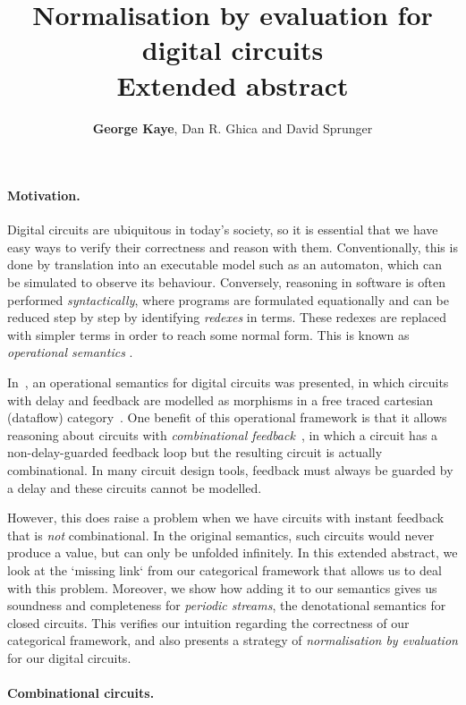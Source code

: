 \documentclass[11pt,numbib]{article}
\title{\vspace{-2em}\huge Normalisation by evaluation for digital circuits\\\Large\textbf{Extended abstract}}
\author{\textbf{George Kaye}, Dan R. Ghica and David Sprunger}
\begin{document}
    
\maketitle

\paragraph*{Motivation.}

Digital circuits are ubiquitous in today's society, so it is essential that we have easy ways to  verify their correctness and reason with them.
Conventionally, this is done by translation into an executable model such as an automaton, which can be simulated to observe its behaviour.
Conversely, reasoning in software is often performed \textit{syntactically}, where programs are formulated equationally and can be reduced step by step by identifying \textit{redexes} in terms. 
These redexes are replaced with simpler terms in order to reach some normal form.
This is known as \textit{operational semantics} \cite{plotkin2004semantics}.

In~\cite{ghica2016categorical}, an operational semantics for digital circuits was presented, in which circuits with delay and feedback are modelled as morphisms in a free traced cartesian (dataflow) category~\parencite{cazanescu1990algebraic,cazanescu1994feedback}.
One benefit of this operational framework is that it allows reasoning about circuits with \emph{combinational feedback}~\parencite[Example 1]{ghica2016categorical}, in which a circuit has a non-delay-guarded feedback loop but the resulting circuit is actually combinational.
In many circuit design tools, feedback must always be guarded by a delay and these circuits cannot be modelled.

However, this does raise a problem when we have circuits with instant feedback that is \emph{not} combinational.
In the original semantics, such circuits would never produce a value, but can only be unfolded infinitely.
In this extended abstract, we look at the `missing link` from our categorical framework that allows us to deal with this problem.
Moreover, we show how adding it to our semantics gives us soundness and completeness for \emph{periodic streams}, the denotational semantics for closed circuits.
This verifies our intuition regarding the correctness of our categorical framework, and also presents a strategy of \emph{normalisation by evaluation} for our digital circuits.


\paragraph*{Combinational circuits.}
\end{document}
